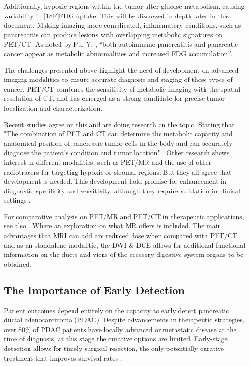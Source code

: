 \documentclass[11pt]{article} %
\begin{document}
Additionally, hypoxic regions within the tumor alter glucose metabolism, causing variability in [18F]FDG uptake. This will be discussed in depth later in this document. Making imaging more complicated, inflammatory conditions, such as pancreatitis can produce lesions with overlapping metabolic signatures on PET/CT. As noted by Pu, Y. \cite{Pu2021}, ``both autoimmune pancreatitis and pancreatic cancer appear as metabolic abnormalities and increased FDG accumulation''.



The challenges presented above highlight the need of development on advanced imaging modalities to ensure accurate diagnosis and staging of these types of cancer. PET/CT combines the sensitivity of metabolic imaging with the spatial resolution of CT, and has emerged as a strong candidate for precise tumor localization and characterization.

Recent studies agree on this and are doing research on the topic. Stating that "The combination of PET and CT can determine the metabolic capacity and anatomical position of pancreatic tumor cells in the body and can accurately diagnose the patient's condition and tumor location" \cite{Pu2021}. Other research shows interest in different modalities, such as PET/MR and the use of other radiotracers for targeting hypoxic or stromal regions. But they all agree that development is needed. This development hold promise for enhancement in diagnostic specificity and sensitivity, although they require validation in clinical settings \cite{Cancers2023}. 


For comparative analysis on PET/MR and PET/CT in therapeutic applications, see also \cite{myownotherpaper}. Where an exploration on what MR offers is included. The main advantages that MRI can add are reduced dose when compared with PET/CT and as an standalone modalitie, the DWI \& DCE allows for additional functional information on the ducts and viens of the accesory digestive system organs to be obtained.


\subsection{The Importance of Early Detection}

Patient outcomes depend entirely on the capacity to early detect pancreatic ductal adenocarcinoma (PDAC). Despite advancements in therapeutic strategies, over 80\% of PDAC patients have locally advanced or metastatic disease at the time of diagnosis, at this stage the curative options are limited. Early-stage detection allows for timely surgical resection, the only potentially curative treatment that improves survival rates \cite{Cancers2023}. 
\end{document}
